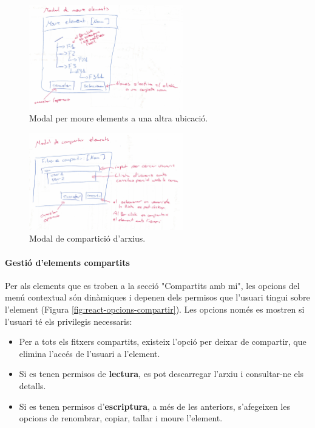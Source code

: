 \begin{figure}[H]
    \centering
    \includegraphics[width=0.6\textwidth]{Figures/interficies/react-modal-moure-elements.jpg}
    \caption{Modal per moure elements a una altra ubicació.}
    \label{fig:react-modal-moure-elements}
\end{figure}

\begin{figure}[H]
    \centering
    \includegraphics[width=0.6\textwidth]{Figures/interficies/react-modal-compartir-fitxer.jpg}
    \caption{Modal de compartició d'arxius.}
    \label{fig:react-modal-compartir-fitxer}
\end{figure}

\paragraph{Gestió d'elements compartits}
Per als elements que es troben a la secció "Compartits amb mi", les opcions del menú contextual són dinàmiques i depenen dels permisos que l'usuari tingui sobre l'element (Figura \ref{fig:react-opcions-compartir}). Les opcions només es mostren si l'usuari té els privilegis necessaris:
\begin{itemize}
    \item Per a tots els fitxers compartits, existeix l'opció per deixar de compartir, que elimina l'accés de l'usuari a l'element.
    \item Si es tenen permisos de \textbf{lectura}, es pot descarregar l'arxiu i consultar-ne els detalls.
    \item Si es tenen permisos d'\textbf{escriptura}, a més de les anteriors, s'afegeixen les opcions de renombrar, copiar, tallar i moure l'element.
\end{itemize}

